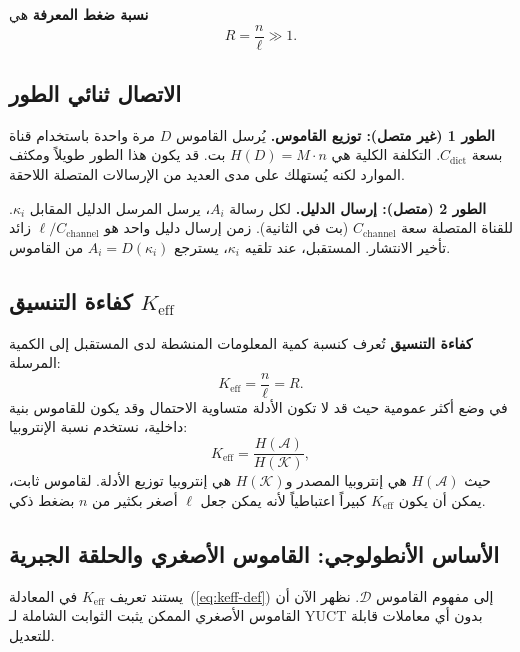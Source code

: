 \documentclass[12pt,a4paper]{article}
\newcommand{\Keff}{K_{\mathrm{eff}}}
\theoremstyle{remark}
\begin{document}
	\textbf{نسبة ضغط المعرفة} هي
	\begin{equation}
		R = \frac{n}{\ell} \gg 1.
	\end{equation}
	
	\subsection{الاتصال ثنائي الطور}
	
	\textbf{الطور 1 (غير متصل): توزيع القاموس.} يُرسل القاموس \(D\) مرة واحدة باستخدام قناة بسعة \(C_{\text{dict}}\). التكلفة الكلية هي \(H(D) = M \cdot n\) بت. قد يكون هذا الطور طويلاً ومكثف الموارد لكنه يُستهلك على مدى العديد من الإرسالات المتصلة اللاحقة.
	
	\textbf{الطور 2 (متصل): إرسال الدليل.} لكل رسالة \(A_i\)، يرسل المرسل الدليل المقابل \(\kappa_i\). للقناة المتصلة سعة \(C_{\text{channel}}\) (بت في الثانية). زمن إرسال دليل واحد هو \(\ell / C_{\text{channel}}\) زائد تأخير الانتشار. المستقبل، عند تلقيه \(\kappa_i\)، يسترجع \(A_i = D(\kappa_i)\) من القاموس.
	
	\subsection{كفاءة التنسيق \(\Keff\)}
	\label{sec:keff-def}
	
	\textbf{كفاءة التنسيق} تُعرف كنسبة كمية المعلومات المنشطة لدى المستقبل إلى الكمية المرسلة:
	\begin{equation}
		\Keff = \frac{n}{\ell} = R. \label{eq:keff-def}
	\end{equation}
	في وضع أكثر عمومية حيث قد لا تكون الأدلة متساوية الاحتمال وقد يكون للقاموس بنية داخلية، نستخدم نسبة الإنتروبيا:
	\begin{equation}
		\Keff = \frac{H(\mathcal{A})}{H(\mathcal{K})},
	\end{equation}
	حيث \(H(\mathcal{A})\) هي إنتروبيا المصدر و\(H(\mathcal{K})\) هي إنتروبيا توزيع الأدلة. لقاموس ثابت، يمكن أن يكون \(\Keff\) كبيراً اعتباطياً لأنه يمكن جعل \(\ell\) أصغر بكثير من \(n\) بضغط ذكي.
	
	\subsection{الأساس الأنطولوجي: القاموس الأصغري والحلقة الجبرية}
	\label{subsec:minimal-dict}
	
	يستند تعريف \(K_{\mathrm{eff}}\) في المعادلة~(\ref{eq:keff-def}) إلى مفهوم القاموس \(\mathcal{D}\). نظهر الآن أن القاموس الأصغري الممكن يثبت الثوابت الشاملة لـ YUCT بدون أي معاملات قابلة للتعديل.
	
\end{document}
